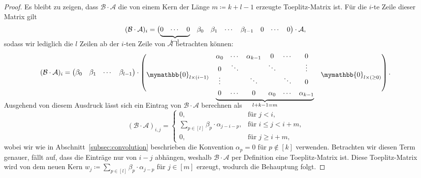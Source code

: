 \documentclass[paper=a4, 	%
		fontsize=11pt,
		abstract=true, 	%
		headsepline, 	%
		notitlepage	%
		]{scrartcl}
\theoremstyle{definition}
\newcommand{\fNat}[1]{[ #1 ]}
\begin{document}
\begin{proof}
    Es bleibt zu zeigen, dass $\mathcal{B}\cdot \mathcal{A}$ die von einem Kern der Länge $m\coloneqq k+l-1$ erzeugte Toeplitz-Matrix ist. 
    Für die $i$-te Zeile dieser Matrix gilt
    \[
        (\mathcal{B} \cdot \mathcal{A})_i
        = \begin{pmatrix}
                \smash[b]{\underbrace{\begin{matrix}0 & \cdots & 0\end{matrix}}_{i-1}} & \beta_0 & \beta_1 & \cdots & \beta_{l-1} & 0 & \cdots & 0
            \end{pmatrix} \cdot \mathcal{A}, \\[1em]
    \]
    sodass wir lediglich die $l$ Zeilen ab der $i$-ten Zeile von $\mathcal{A}$ betrachten können:
    \[
        (\mathcal{B} \cdot \mathcal{A})_i = 
            \begin{pmatrix}
                \beta_0 & \beta_1 & \cdots & \beta_{l-1}
            \end{pmatrix} \cdot \begin{pmatrix}
                \mymathbb{0}_{l\times (i-1)} & \smash[b]{\underbrace{\begin{matrix}
                    \alpha_0 & \cdots & \alpha_{k-1} & 0 & \cdots & 0 \\
                    0 & \ddots & & \ddots  & & \vdots \\
                    \vdots  & & \ddots & & \ddots & 0 \\[4pt]
                    0 & \cdots & 0 & \alpha_0 & \cdots & \alpha_{k-1} \\
            \end{matrix}}_{l + k - 1 = m}} & \mymathbb{0}_{l\times (\geq 0)}\\[2em]
        \end{pmatrix}. \\[2em]
    \]

    Ausgehend von diesem Ausdruck lässt sich ein Eintrag von $\mathcal{B}\cdot \mathcal{A}$ berechnen als
    \[
        (\mathcal{B}\cdot \mathcal{A})_{i,j} = \begin{cases}
            0, & \text{für $j < i$,}\\
            \sum_{p\in \fNat{l}} \beta_{p} \cdot \alpha_{j - i - p}, & \text{für $i \leq j < i+m$,}\\
            0, & \text{für $j \geq i+m$,}
        \end{cases}
    \]
    wobei wir wie in Abschnitt~\ref{subsec:convolution} beschrieben die Konvention $\alpha_p = 0$ für $p\notin \fNat{k}$ verwenden.
    Betrachten wir diesen Term genauer, fällt auf, dass die Einträge nur von $i-j$ abhängen, weshalb $\mathcal{B}\cdot \mathcal{A}$ per Definition eine Toeplitz-Matrix ist.
    Diese Toeplitz-Matrix wird von dem neuen Kern $w_j \coloneqq \sum_{p\in\fNat{l}} \beta_p \cdot \alpha_{j - p}$ für $j\in\fNat{m}$ erzeugt, wodurch die Behauptung folgt.
\end{proof}
\end{document}
